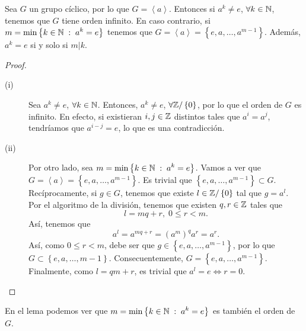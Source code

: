 \begin{lema}
	Sea $\displaystyle G $ un grupo cíclico, por lo que $\displaystyle G = \left\langle a \right\rangle  $. Entonces si $\displaystyle a^{k} \neq e $, $\displaystyle \forall k \in \mathbb{N} $, tenemos que $\displaystyle G $ tiene orden infinito. En caso contrario, si $\displaystyle m = \min \left\{ k \in \mathbb{N} \; : \; a^{k} = e\right\}  $ tenemos que $\displaystyle G = \left\langle a \right\rangle = \left\{ e, a, \ldots, a^{m-1}\right\}  $. Además, $\displaystyle a^{k} = e $ si y solo si $\displaystyle m | k $.
\end{lema}
\begin{proof}
\begin{description}
	\item[(i)] Sea $\displaystyle a^{k} \neq e $, $\displaystyle \forall k \in \mathbb{N} $. Entonces, $\displaystyle a^{k} \neq e $, $\displaystyle \forall \mathbb{Z} / \left\{0 \right\}  $, por lo que el orden de $\displaystyle G $ es infinito. En efecto, si existieran $\displaystyle i, j \in \mathbb{Z} $ distintos tales que $\displaystyle a^{i} = a^{j} $, tendríamos que $\displaystyle a^{i-j} = e $, lo que es una contradicción. 
	\item[(ii)] Por otro lado, sea $\displaystyle m = \min \left\{ k \in \mathbb{N} \; : \; a^{k} = e\right\}  $. Vamos a ver que $\displaystyle G = \left\langle a \right\rangle = \left\{ e, a, \ldots, a^{m - 1}\right\}  $. Es trivial que $\displaystyle \left\{ e, a, \ldots, a^{m - 1}\right\} \subset G $. Recíprocamente, si $\displaystyle g \in G $, tenemos que existe $\displaystyle l \in \mathbb{Z} / \left\{ 0\right\}  $ tal que $\displaystyle g = a^{l} $. Por el algoritmo de la división, tenemos que existen $\displaystyle q, r \in \mathbb{Z} $ tales que
		\[l = mq + r, \; 0 \leq r < m .\]
		Así, tenemos que 
		\[a^{l} = a^{mq + r}= \left(a^{m}\right)^{q}a^{r} = a^{r}.\]
		Así, como $\displaystyle 0 \leq r < m $, debe ser que $\displaystyle g \in \left\{ e, a, \ldots, a^{m - 1}\right\}  $, por lo que $\displaystyle G \subset \left\{ e, a, \ldots, m - 1\right\}  $. Consecuentemente, $\displaystyle G = \left\{ e, a, \ldots, a^{m - 1}\right\}  $. \\
		Finalmente, como $\displaystyle l = qm+r $, es trivial que $\displaystyle a^{l} = e \iff r = 0 $.
\end{description}
\end{proof}
\begin{observation}
	En el lema podemos ver que $\displaystyle m = \min \left\{ k \in \mathbb{N}\; : \; a^{k} = e\right\}  $ es también el orden de $\displaystyle G $.
\end{observation}


